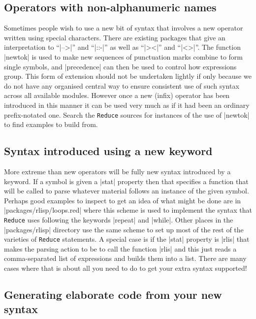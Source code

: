 \documentclass[12pt,twoside,openright]{memoir}
\newcommand{\reduce}{\texttt{Reduce}\xspace}
\begin{document}
\subsection{Operators with non-alphanumeric names}

Sometimes people wish to use a new bit of syntax that involves a new
operator written using special characters. There are existing packages that
give an interpretation to ``|-->|'' and ``|::-|'' as well as ``|><|'' and
``|<>|''. The function |newtok| is used to make new sequences of punctuation
marks combine to form single symbols, and |precedence| can then be used to
control how expressions group. This form of extension should not be
undertaken lightly if only because we do not have any organised central way to
ensure consistent use of such syntax across all available modules. However
once a new (infix) operator has been introduced in this manner it can
be used very much as if it had been an ordinary prefix-notated one. Search the
\reduce sources for instances of the use of |newtok| to find examples to
build from.

\subsection{Syntax introduced using a new keyword}

More extreme than new operators will be fully new syntax introduced by
a keyword. If a symbol is given a |stat| property then that specifies
a function that will be called to parse whatever material follows an instance
of the given symbol. Perhaps good examples to inspect to get an idea of what
might be done are in |packages/rlisp/loops.red| where this scheme is
used to implement the syntax that \reduce uses following the keywords
|repeat| and |while|. Other places in the |packages/rlisp| directory use the
same scheme to set up most of the rest of the varieties of \reduce
statements. A special case is if the |stat| property is |rlis| that makes
the parsing action to be to call the function |rlis| and this just reads a
comma-separated list of expressions and builds them into a list. There are
many cases where that is about all you need to do to get your extra syntax
supported!

\subsection{Generating elaborate code from your new syntax}
\end{document}
